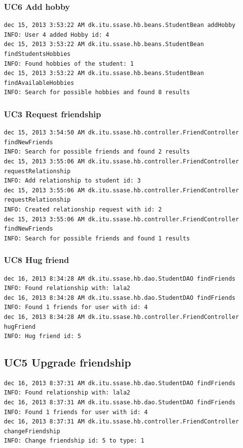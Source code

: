 \documentclass[a4paper]{article}
\begin{document}
\subsubsection{UC6 Add hobby}
\begin{verbatim}
dec 15, 2013 3:53:22 AM dk.itu.ssase.hb.beans.StudentBean addHobby
INFO: User 4 added Hobby id: 4 
dec 15, 2013 3:53:22 AM dk.itu.ssase.hb.beans.StudentBean findStudentsHobbies
INFO: Found hobbies of the student: 1
dec 15, 2013 3:53:22 AM dk.itu.ssase.hb.beans.StudentBean findAvailableHobbies
INFO: Search for possible hobbies and found 8 results
\end{verbatim}

\subsubsection{UC3 Request friendship}
\begin{verbatim}
dec 15, 2013 3:54:50 AM dk.itu.ssase.hb.controller.FriendController 
findNewFriends
INFO: Search for possible friends and found 2 results
dec 15, 2013 3:55:06 AM dk.itu.ssase.hb.controller.FriendController 
requestRelationship
INFO: Add relationship to student id: 3
dec 15, 2013 3:55:06 AM dk.itu.ssase.hb.controller.FriendController 
requestRelationship
INFO: Created relationship request with id: 2
dec 15, 2013 3:55:06 AM dk.itu.ssase.hb.controller.FriendController 
findNewFriends
INFO: Search for possible friends and found 1 results
\end{verbatim}

\subsubsection{UC8 Hug friend}
\begin{verbatim}
dec 16, 2013 8:34:28 AM dk.itu.ssase.hb.dao.StudentDAO findFriends
INFO: Found relationship with: lala2
dec 16, 2013 8:34:28 AM dk.itu.ssase.hb.dao.StudentDAO findFriends
INFO: Found 1 friends for user with id: 4
dec 16, 2013 8:34:28 AM dk.itu.ssase.hb.controller.FriendController hugFriend
INFO: Hug friend id: 5
\end{verbatim}

\subsection{UC5 Upgrade friendship}
\begin{verbatim}
dec 16, 2013 8:37:31 AM dk.itu.ssase.hb.dao.StudentDAO findFriends
INFO: Found relationship with: lala2
dec 16, 2013 8:37:31 AM dk.itu.ssase.hb.dao.StudentDAO findFriends
INFO: Found 1 friends for user with id: 4
dec 16, 2013 8:37:31 AM dk.itu.ssase.hb.controller.FriendController changeFriendship
INFO: Change friendship id: 5 to type: 1
\end{verbatim}
\end{document}
